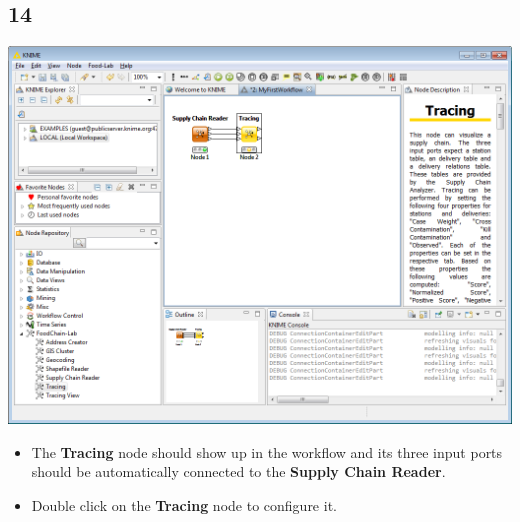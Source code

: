 \documentclass{beamer}
\begin{document}
\subsection{14}
\begin{frame}
	\begin{center}
  		\includegraphics[height=0.6\textheight]{14.png}
	\end{center}
	\begin{itemize}
		\item The \textbf{Tracing} node should show up in the workflow and its three input ports should be automatically connected to the \textbf{Supply Chain Reader}.
		\item Double click on the \textbf{Tracing} node to configure it.
	\end{itemize}
\end{frame}
\end{document}
